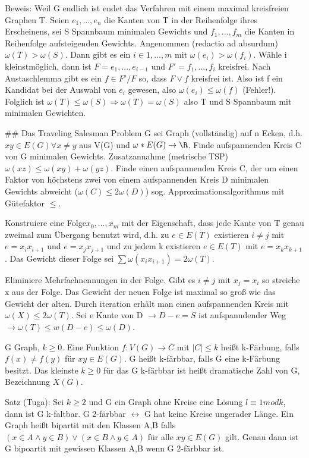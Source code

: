 \documentclass[10pt,landscape]{article}
\begin{document}
\begin{multicols}{3}
{{Beweis: Weil G endlich ist endet das Verfahren mit einem maximal kreisfreien Graphen T. Seien $e_1,...,e_n$ die Kanten von T in der Reihenfolge ihres Erscheinens, sei S Spannbaum minimalen Gewichts und $f_1,...,f_m$ die Kanten in Reihenfolge aufsteigenden Gewichts. Angenommen (redactio ad absurdum) $\omega(T)>\omega(S)$. Dann gibt es ein $i\in{1,...,m}$ mit $\omega(e_i)>\omega(f_i)$. Wähle i kleinstmöglich, dann ist $F={e_1,...,e_{i-1}}$ und $F'={f_1,...,f_i}$ kreisfrei. Nach Austaschlemma gibt es ein $f\in F'/F$ so, dass $F\vee {f}$ kreisfrei ist. Also ist f ein Kandidat bei der Auswahl von $e_i$ gewesen, also $\omega(e_i)\leq \omega(f)$ (Fehler!). Folglich ist $\omega(T)\leq \omega(S) \Rightarrow \omega(T)=\omega(S)$ also T und S Spannbaum mit minimalen Gewichten.

## Das Traveling Salesman Problem
G sei Graph (vollständig) auf n Ecken, d.h. $xy\in E(G) \forall x\not =y$ aus V(G) und $\omega*E(G)\rightarrow \R$. Finde aufspannenden Kreis C von G minimalen Gewichts. Zusatzannahme (metrische TSP) $\omega(xz)\leq \omega(xy)+\omega(yz)$. 
Finde einen aufspannenden Kreis C, der um einen Faktor von höchstens zwei von einem aufspannenden Kreis D minimalen Gewichts abweicht ($\omega(C)\leq 2 \omega(D)$) sog. Approximationsalgorithmus mit Gütefaktor $\leq$.

Konstruiere eine Folge$x_0,...,x_m$ mit der Eigenschaft, dass jede Kante von T genau zweimal zum Übergang benutzt wird, d.h. zu $e\in E(T)$ existieren $i\not = j$ mit $e=x_i x_{i+1}$ und $e=x_j x_{j+1}$ und zu jedem k existieren $e\in E(T)$ mit $e=x_k x_{k+1}$. Das Gewicht dieser Folge sei $\sum \omega(x_i x_{i+1})= 2\omega(T)$.

Eliminiere Mehrfachnennungen in der Folge. Gibt es $i\not= j$ mit $x_j=x_i$ so streiche x aus der Folge. Das Gewicht der neuen Folge ist maximal so groß wie das Gewicht der alten. Durch iteration erhält man einen aufspannenden Kreis mit $\omega(X) \leq 2 \omega(T)$. Sei e Kante von D $\rightarrow D-e=S$ ist aufspanndender Weg $\rightarrow \omega(T) \leq w(D-e) \leq \omega (D)$.

G Graph, $k\geq 0$. Eine Funktion $f:V(G)\rightarrow C$ mit $|C|\leq k$ heißt k-Färbung, falls $f(x)\not = f(y)$ für $xy\in E(G)$. G heißt k-färbbar, falls G eine k-Färbung besitzt. Das kleinste $k\geq 0$ für das G k-färbbar ist heißt dramatische Zahl von G, Bezeichnung $X(G)$.



Satz (Tuga): Sei $k\geq 2$ und G ein Graph ohne Kreise eine Lösung $l\equiv 1 mod k$, dann ist G k-faltbar. G 2-färbbar $\leftrightarrow$ G hat keine Kreise ungerader Länge. Ein Graph heißt bipartit mit den Klassen A,B falls $(x\in A \wedge y\in B)\vee (x\in B \wedge y\in A)$ für alle $xy \in E(G)$ gilt. Genau dann ist G bipoartit mit gewissen Klassen A,B wenn G 2-färbbar ist.

}}
\end{multicols}
\end{document}
